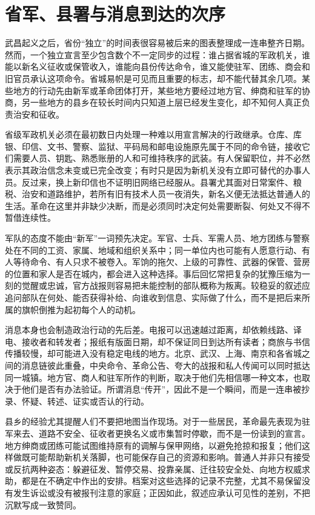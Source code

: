 \section{省军、县署与消息到达的次序}

武昌起义之后，省份“独立”的时间表很容易被后来的图表整理成一连串整齐日期。然而，一个独立宣言至少包含数个不一定同步的过程：谁占据省城的军政机关，谁能以新名义征收或保管收入，谁能向县份传达命令，谁又能使驻军、团练、商会和旧官员承认这项命令。省城易帜是可见而且重要的标志，却不能代替其余几项。某些地方的行动先由新军或革命团体打开，某些地方要经过地方官、绅商和驻军的协商，另一些地方的县乡在较长时间内只知道上层已经发生变化，却不知何人真正负责治安和征收。

省级军政机关必须在最初数日内处理一种难以用宣言解决的行政继承。仓库、库银、印信、文书、警察、监狱、平码局和邮电设施原先属于不同的命令链，接收它们需要人员、钥匙、熟悉账册的人和可维持秩序的武装。有人保留职位，并不必然表示其政治信念未变或已完全改变；有时只是因为新机关没有立即可替代的办事人员。反过来，换上新印信也不证明旧网络已经服从。县署尤其面对日常案件、粮税、治安和道路维护，若所有旧有技术人员一夜消失，新名义便无法抵达普通人的生活。革命在这里并非缺少决断，而是必须同时决定何处需要断裂、何处又不得不暂借连续性。

军队的态度不能由“新军”一词预先决定。军官、士兵、军需人员、地方团练与警察处在不同的工资、家属、地域和组织关系中；同一单位内也可能有人愿意行动、有人等待命令、有人只求不被卷入。军饷的拖欠、上级的可靠性、武器的保管、营房的位置和家人是否在城内，都会进入这种选择。事后回忆常把复杂的犹豫压缩为一刻的觉醒或忠诚，官方战报则容易把未能控制的部队概称为叛离。较稳妥的叙述应追问部队在何处、能否获得补给、向谁收到信息、实际做了什么，而不是把后来所属的旗帜倒推为起初每个人的动机。

消息本身也会制造政治行动的先后差。电报可以迅速越过距离，却依赖线路、译电、接收者和转发者；报纸有版面日期，却不保证同日到达所有读者；商旅与书信传播较慢，却可能进入没有稳定电线的地方。北京、武汉、上海、南京和各省城之间的消息链彼此重叠，中央命令、革命公告、夸大的战报和私人传闻可以同时抵达同一城镇。地方官、商人和驻军所作的判断，取决于他们先相信哪一种文本，也取决于他们是否有办法验证。所谓消息“传开”，因此不是一个瞬间，而是一连串被抄录、怀疑、转述、证实或否认的行动。

县乡的经验尤其提醒人们不要把地图当作现场。对于一些居民，革命最先表现为驻军来去、道路不安全、征收者更换名义或市集暂时停歇，而不是一份读到的宣言。地方绅商或团练可能试图维持原有的调解与保甲网络，以避免抢掠和报复；他们这样做既可能帮助新机关落脚，也可能保存自己的资源和影响。普通人并非只有接受或反抗两种姿态：躲避征发、暂停交易、投靠亲属、迁往较安全处、向地方权威求助，都是在不确定中作出的安排。档案对这些选择的记录不完整，尤其不易保留没有发生诉讼或没有被报刊注意的家庭；正因如此，叙述应承认可见性的差别，不把沉默写成一致赞同。

